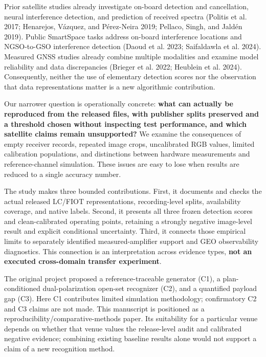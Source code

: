 \documentclass[
  10pt,
]{article}
\begin{document}
Prior satellite studies already investigate on-board detection and
cancellation, neural interference detection, and prediction of received
spectra (Politis et al. 2017; Henarejos, Vázquez, and Pérez-Neira 2019;
Pellaco, Singh, and Jaldén 2019). Public SmartSpace tasks address
on-board interference locations and NGSO-to-GSO interference detection
(Daoud et al. 2023; Saifaldawla et al. 2024). Measured GNSS studies
already combine multiple modalities and examine model reliability and
data discrepancies (Brieger et al. 2022; Heublein et al. 2024).
Consequently, neither the use of elementary detection scores nor the
observation that data representations matter is a new algorithmic
contribution.

Our narrower question is operationally concrete: \textbf{what can
actually be reproduced from the released files, with publisher splits
preserved and a threshold chosen without inspecting test performance,
and which satellite claims remain unsupported?} We examine the
consequences of empty receiver records, repeated image crops,
uncalibrated RGB values, limited calibration populations, and
distinctions between hardware measurements and reference-channel
simulation. These issues are easy to lose when results are reduced to a
single accuracy number.

The study makes three bounded contributions. First, it documents and
checks the actual released LC/FIOT representations, recording-level
splits, availability coverage, and native labels. Second, it presents
all three frozen detection scores and clean-calibrated operating points,
retaining a strongly negative image-level result and explicit
conditional uncertainty. Third, it connects those empirical limits to
separately identified measured-amplifier support and GEO observability
diagnostics. This connection is an interpretation across evidence types,
\textbf{not an executed cross-domain transfer experiment}.

The original project proposed a reference-traceable generator (C1), a
plan-conditioned dual-polarization open-set recognizer (C2), and a
quantified payload gap (C3). Here C1 contributes limited simulation
methodology; confirmatory C2 and C3 claims are not made. This manuscript
is positioned as a reproducibility/comparative-methods paper. Its
suitability for a particular venue depends on whether that venue values
the release-level audit and calibrated negative evidence; combining
existing baseline results alone would not support a claim of a new
recognition method.
\end{document}
